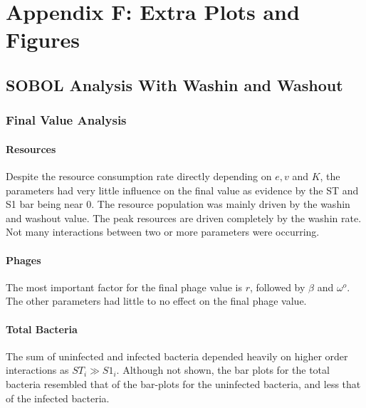 \chapter{Appendix F: Extra Plots and Figures}
\label{AppendixF}

\section{SOBOL Analysis With Washin and Washout}
\label{sec:AppendixF:sobol_analysis_with_washin_and_washout}
\subsection{Final Value Analysis}
\subsubsection{Resources}
Despite the resource consumption rate directly depending on $e, v$ and $K$, the parameters had very little influence on the final value as evidence by the ST and S1 bar being near 0. 
The resource population was mainly driven by the washin and washout value. 
The peak resources are driven completely by the washin rate. 
Not many interactions between two or more parameters were occurring. 

\subsubsection{Phages}
The most important factor for the final phage value is $r$, followed by $\beta$ and $\omega^o$. 
The other parameters had little to no effect on the final phage value. 

\subsubsection{Total Bacteria}
The sum of uninfected and infected bacteria depended heavily on higher order interactions as $ST_i \gg S1_i$. 
Although not shown, the bar plots for the total bacteria resembled that of the bar-plots for the uninfected bacteria, and less that of the infected bacteria. 

